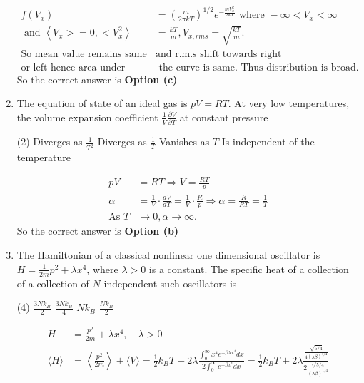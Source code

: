\begin{enumerate}
\begin{answer}
\begin{align*}
	f\left(V_{x}\right)&=\left(\frac{m}{2 \pi k T}\right)^{1 / 2} e^{-\frac{m V_{x}^{2}}{2 k T}} \text { where }-\infty<V_{x}<\infty\\
	\text { and }\left\langle V_{x}>=0,<V_{x}^{2}\right\rangle&=\frac{k T}{m}, V_{x, r m s}=\sqrt{\frac{k T}{m}} \text {. }\\
	\text{So mean value remains same }&\text{and r.m.s shift towards right}\\
	\text{or left hence area under}&\text{ the curve is same. Thus distribution is broad.}
	\end{align*}
		So the correct answer is \textbf{Option (c)}
\end{answer}
\item  The equation of state of an ideal gas is $p V=R T .$ At very low temperatures, the volume expansion coefficient $\frac{1}{V} \frac{\partial V}{\partial T}$ at constant pressure
 \begin{tasks}(2)
	\task[\textbf{a.}]Diverges as $\frac{1}{T^{2}}$
	\task[\textbf{b.}]Diverges as $\frac{1}{T}$
	\task[\textbf{c.}]Vanishes as $T$
	\task[\textbf{d.}]Is independent of the temperature 
\end{tasks}
\begin{answer}
	\begin{align*}
	p V&=R T \Rightarrow V=\frac{R T}{p}\\
	\alpha&=\frac{1}{V} \cdot \frac{d V}{d T}=\frac{1}{V} \cdot \frac{R}{p} \Rightarrow \alpha=\frac{R}{R T}=\frac{1}{T}\\
	\text{As }T &\rightarrow 0, \alpha \rightarrow \infty.
	\end{align*}
		So the correct answer is \textbf{Option (b)}
\end{answer}
\item  The Hamiltonian of a classical nonlinear one dimensional oscillator is $H=\frac{1}{2 m} p^{2}+\lambda x^{4}$, where $\lambda>0$ is a constant. The specific heat of a collection of a collection of $N$ independent such oscillators is
 \begin{tasks}(4)
	\task[\textbf{a.}]$\frac{3 N k_{B}}{2}$
	\task[\textbf{b.}]$\frac{3 N k_{B}}{4}$
	\task[\textbf{c.}]$N k_{B}$
	\task[\textbf{d.}]$\frac{N k_{B}}{2}$ 
\end{tasks}
\begin{answer}
	\begin{align*}
	H&=\frac{p^{2}}{2 m}+\lambda x^{4}, \quad \lambda>0\\
	\langle H\rangle&=\left\langle\frac{p^{2}}{2 m}\right\rangle+\langle V\rangle=\frac{1}{2} k_{B} T+2 \lambda \frac{\int_{0}^{\infty} x^{4} e^{-\beta \lambda x^{4}} d x}{2 \int_{0}^{\infty} e^{-\beta x^{4}} d x}=\frac{1}{2} k_{B} T+2 \lambda \frac{\frac{\sqrt{5 / 4}}{4(\lambda \beta)^{5 / 4}}}{2 \frac{\sqrt{5 / 4}}{(\lambda \beta)^{1 / 4}}}\\

\end{align*}
\end{answer}
\end{enumerate}
